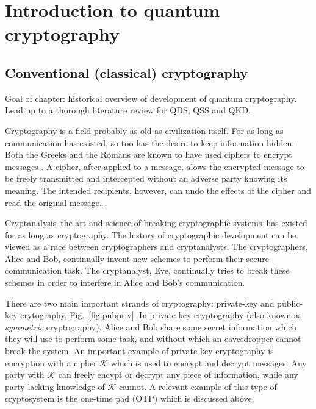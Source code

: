 \chapter{Introduction to quantum cryptography}

\section{Conventional (classical) cryptography}
Goal of chapter: historical overview of development of quantum cryptography. Lead up to a thorough literature review for QDS, QSS and QKD.

Cryptography is a field probably as old as civilization itself. For as long as communication has existed, so too has the desire to keep information hidden. Both the Greeks and the Romans are known to have used ciphers to encrypt messages . A cipher, after applied to a message, alows the encrypted message to be freely transmitted and intercepted without an adverse party knowing its meaning. The intended recipients, however, can undo the effects of the cipher and read the original message. .

Cryptanalysis--the art and science of breaking cryptographic systems--has existed for as long as cryptography. The history of cryptographic development can be viewed as a race between cryptographers and cryptanalysts. The cryptographers, Alice and Bob, continually invent new schemes to perform their secure communication task. The cryptanalyst, Eve, continually tries to break these schemes in order to interfere in Alice and Bob's communication.

There are two main important strands of cryptography: private-key and public-key crytography, Fig.~\ref{fig:pubpriv}. In private-key cryptography (also known as \emph{symmetric} cryptography), Alice and Bob share some secret information which they will use to perform some task, and without which an eavesdropper cannot break the system. An important example of private-key cryptography is encryption with a cipher $\mathcal{K}$ which is used to encrypt and decrypt messages. Any party with $\mathcal{K}$ can freely encypt or decrypt any piece of information, while any party lacking knowledge of $\mathcal{K}$ cannot. A relevant example of this type of cryptosystem is the one-time pad (OTP) which is discussed above.



